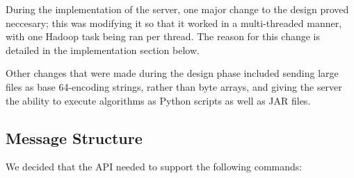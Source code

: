 During the implementation of the server, one major change to the design proved neccesary; this was modifying it so that it worked in a multi-threaded manner, with one Hadoop task being ran per thread. The reason for this change is detailed in the implementation section below.

Other changes that were made during the design phase included sending large files as base 64-encoding strings, rather than byte arrays, and giving the server the ability to execute algorithms as Python scripts as well as JAR files.

\subsection{Message Structure}

We decided that the API needed to support the following commands:

